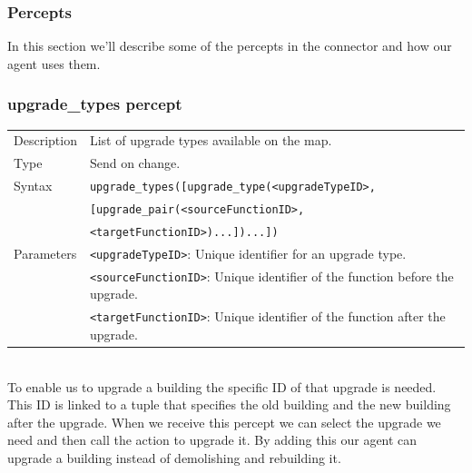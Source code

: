 \subsubsection{Percepts}
In this section we'll describe some of the percepts in the connector and how our agent uses them.

	\subsubsection*{upgrade\_types percept}
		\begin{small}
			\begin{tabular}{p{2cm}p{9cm}}
				Description 	& List of upgrade types available on the map.\\
				Type 		& Send on change.\\
				Syntax 	& \verb|upgrade_types([upgrade_type(<upgradeTypeID>,|\\
						& \verb|[upgrade_pair(<sourceFunctionID>, |\\
						& \verb|<targetFunctionID>)...])...])|\\
				Parameters 	& \verb|<upgradeTypeID>|: Unique identifier for an upgrade type.\\
						& \verb|<sourceFunctionID>|: Unique identifier of the function before the upgrade.\\
						& \verb|<targetFunctionID>|:  Unique identifier of the function after the upgrade.\\
			\end{tabular}
		\end{small}
	\\To enable us to upgrade a building the specific ID of that upgrade is needed. This ID is linked to a tuple that specifies the old building and the new building after the upgrade. When we receive this percept we can select the upgrade we need and then call the action to upgrade it. By adding this our agent can upgrade a building instead of demolishing and rebuilding it.

